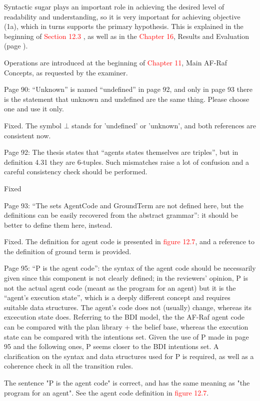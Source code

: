 \documentclass{article}
\newcommand*\R[1]{\textcolor{red}{#1}} %
\newenvironment{them}{\noindent\begingroup\color{blue}}{\endgroup\par}
\begin{document}
Syntactic sugar plays an important role in achieving the desired level of
readability and understanding, so it is very important for achieving objective
(1a), which in turns supports the primary hypothesis. This is explained in the
beginning of \R{Section 12.3} , as well as in the \R{Chapter 16}, Results and
Evaluation (page ).

Operations are introduced at the beginning of \R{Chapter 11}, Main AF-Raf
Concepts, as requested by the examiner.

\begin{them}

Page 90:
“Unknown” is named “undefined” in page 92, and only in page 93 there is the
statement that unknown and undefined are the same thing. Please choose one and
use it only.

\end{them}
Fixed. The symbol $\bot$ stands for 'undefined' or 'unknown', and both
references are consistent now. 

\begin{them}

Page 92:
The thesis states that “agents states themselves are triples”, but in
definition 4.31 they are 6-tuples.  Such mismatches raise a lot of confusion
and a careful consistency check should be performed.

\end{them}
Fixed

\begin{them}

Page 93:
“The sets AgentCode and GroundTerm are not defined here, but the definitions
can be easily recovered from the abstract grammar”: it should be better to
define them here, instead.

\end{them}
Fixed. The definition for agent code is presented in \R{figure 12.7}, and a
reference to the definition of ground term is provided.

\begin{them}

Page 95:
“P is the agent code”: the syntax of the agent code should be necessarily given
since this component is not clearly defined; in the reviewers' opinion, P is
not the actual agent code (meant as the program for an agent) but it is the
“agent's execution state”, which is a deeply different concept and requires
suitable data structures. The agent's code does not (usually) change, whereas
its excecution state does. Referring to the BDI model, the the AF-Raf agent
code can be compared with the plan library + the belief base, whereas the
execution state can be compared with the intentions set. Given the use of P
made in page 95 and the following ones, P seems closer to the BDI intentions
set. A clarification on the syntax and data structures used for P is required,
as well as a coherence check in all the transition rules.

\end{them}
The sentence "P is the agent code" is correct, and has the same meaning as "the
program for an agent". See the agent code definition in \R{figure 12.7}. 
\end{document}
